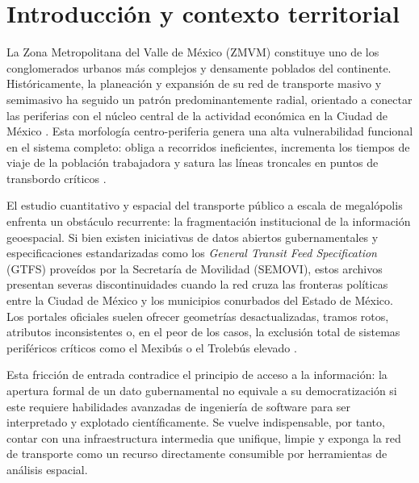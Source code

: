 
\section{Introducción y contexto territorial}

La Zona Metropolitana del Valle de México (ZMVM) constituye uno de los conglomerados
urbanos más complejos y densamente poblados del continente.  Históricamente, la
planeación y expansión de su red de transporte masivo y semimasivo ha seguido un
patrón predominantemente radial, orientado a conectar las periferias con el núcleo
central de la actividad económica en la Ciudad de México
\citep{padilla2022expansion, molinero2002}.  Esta morfología centro-periferia genera
una alta vulnerabilidad funcional en el sistema completo: obliga a recorridos
ineficientes, incrementa los tiempos de viaje de la población trabajadora y satura
las líneas troncales en puntos de transbordo críticos
\citep{semovi2020diagnostico}.

El estudio cuantitativo y espacial del transporte público a escala de megalópolis
enfrenta un obstáculo recurrente: la fragmentación institucional de la información
geoespacial.  Si bien existen iniciativas de datos abiertos gubernamentales y
especificaciones estandarizadas como los \textit{General Transit Feed Specification}
(GTFS) proveídos por la Secretaría de Movilidad (SEMOVI), estos archivos presentan
severas discontinuidades cuando la red cruza las fronteras políticas entre la Ciudad
de México y los municipios conurbados del Estado de México.  Los portales oficiales
suelen ofrecer geometrías desactualizadas, tramos rotos, atributos inconsistentes
o, en el peor de los casos, la exclusión total de sistemas periféricos críticos como
el Mexibús o el Trolebús elevado \citep{hadas2013assessing}.

Esta fricción de entrada contradice el principio de acceso a la información: la
apertura formal de un dato gubernamental no equivale a su democratización si este
requiere habilidades avanzadas de ingeniería de software para ser interpretado y
explotado científicamente.  Se vuelve indispensable, por tanto, contar con una
infraestructura intermedia que unifique, limpie y exponga la red de transporte
como un recurso directamente consumible por herramientas de análisis espacial.

